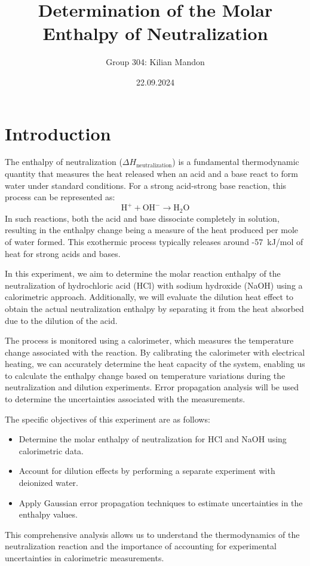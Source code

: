 \documentclass[a4paper,12pt]{article}
\title{Determination of the Molar Enthalpy of Neutralization}
\author{Group 304: Kilian Mandon}
\date{22.09.2024}
\begin{document}
\maketitle

\section{Introduction}
The enthalpy of neutralization (\(\Delta H_{\text{neutralization}}\)) is a fundamental thermodynamic quantity that measures the heat released when an acid and a base react to form water under standard conditions. For a strong acid-strong base reaction, this process can be represented as:
\[
\text{H}^+ + \text{OH}^- \rightarrow \text{H}_2\text{O}
\]
In such reactions, both the acid and base dissociate completely in solution, resulting in the enthalpy change being a measure of the heat produced per mole of water formed. This exothermic process typically releases around -57~kJ/mol of heat for strong acids and bases.

In this experiment, we aim to determine the molar reaction enthalpy of the neutralization of hydrochloric acid (HCl) with sodium hydroxide (NaOH) using a calorimetric approach. Additionally, we will evaluate the dilution heat effect to obtain the actual neutralization enthalpy by separating it from the heat absorbed due to the dilution of the acid.

The process is monitored using a calorimeter, which measures the temperature change associated with the reaction. By calibrating the calorimeter with electrical heating, we can accurately determine the heat capacity of the system, enabling us to calculate the enthalpy change based on temperature variations during the neutralization and dilution experiments. Error propagation analysis will be used to determine the uncertainties associated with the measurements.

The specific objectives of this experiment are as follows:
\begin{itemize}
    \item Determine the molar enthalpy of neutralization for HCl and NaOH using calorimetric data.
    \item Account for dilution effects by performing a separate experiment with deionized water.
    \item Apply Gaussian error propagation techniques to estimate uncertainties in the enthalpy values.
\end{itemize}

This comprehensive analysis allows us to understand the thermodynamics of the neutralization reaction and the importance of accounting for experimental uncertainties in calorimetric measurements.
\end{document}
